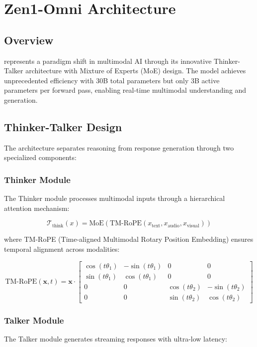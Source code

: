 \section{Zen1-Omni Architecture}
\label{sec:architecture}

\subsection{Overview}

\zen{} represents a paradigm shift in multimodal AI through its innovative Thinker-Talker architecture with Mixture of Experts (MoE) design. The model achieves unprecedented efficiency with 30B total parameters but only 3B active parameters per forward pass, enabling real-time multimodal understanding and generation.

\subsection{Thinker-Talker Design}

The architecture separates reasoning from response generation through two specialized components:

\subsubsection{Thinker Module}
The Thinker module processes multimodal inputs through a hierarchical attention mechanism:

\begin{equation}
\mathcal{T}_{\text{think}}(x) = \text{MoE}\left(\text{TM-RoPE}(x_{\text{text}}, x_{\text{audio}}, x_{\text{visual}})\right)
\end{equation}

where TM-RoPE (Time-aligned Multimodal Rotary Position Embedding) ensures temporal alignment across modalities:

\begin{equation}
\text{TM-RoPE}(\mathbf{x}, t) = \mathbf{x} \cdot \begin{bmatrix}
\cos(t\theta_1) & -\sin(t\theta_1) & 0 & 0 \\
\sin(t\theta_1) & \cos(t\theta_1) & 0 & 0 \\
0 & 0 & \cos(t\theta_2) & -\sin(t\theta_2) \\
0 & 0 & \sin(t\theta_2) & \cos(t\theta_2)
\end{bmatrix}
\end{equation}

\subsubsection{Talker Module}
The Talker module generates streaming responses with ultra-low latency:

